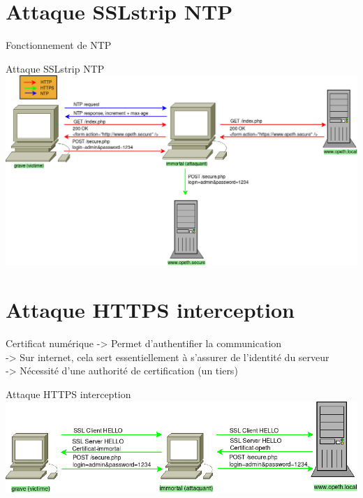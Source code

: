 \documentclass{beamer}
\begin{document}
\section{Attaque SSLstrip NTP}

\begin{frame}{Fonctionnement de NTP}
\end{frame}

\begin{frame}{Attaque SSLstrip NTP}
    \includegraphics[scale=0.32]{../medias/sslstrip-ntp/attack.png}
\end{frame}

\section{Attaque HTTPS interception}

\begin{frame}{Certificat numérique}
    -> Permet d'authentifier la communication \\
    -> Sur internet, cela sert essentiellement à s'assurer de l'identité du serveur \\
    -> Nécessité d'une authorité de certification (un tiers) \\

\end{frame}

\begin{frame}{Attaque HTTPS interception}
    \includegraphics[scale=0.4]{../medias/https-interception/attack.png}
\end{frame}
\end{document}
